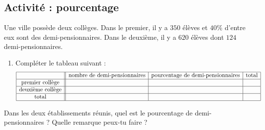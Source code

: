 
\subsection*{Activité : pourcentage}

Une ville possède deux collèges. Dans le premier, il y a $350$ élèves et $40\%$ d'entre eux sont des demi-pensionnaires.  Dans le deuxième, il y a $620$ élèves dont $124$ demi-pensionnaires.  
\begin{enumerate}
    \item
        Compléter le tableau suivant :
        \begin{equation*}
            \begin{array}[]{|c||c|c|c|}
                \hline
                &\text{nombre de demi-pensionnaires}&\text{pourcentage de demi-pensionnaires}&\text{total}\\
                \hline
                \text{premier collège}&&&\\
                \hline
                \text{deuxième collège}&&&\\
                \hline
                \text{total}&&&\\
                \hline
            \end{array}
        \end{equation*}
\end{enumerate}
Dans les deux établissements réunis, quel est le pourcentage de demi-pensionnaires ?  Quelle remarque peux-tu faire ?
